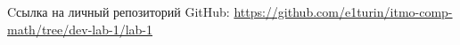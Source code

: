\begin{thebibliography}{}
 Cсылка на личный репозиторий GitHub: \url{https://github.com/e1turin/itmo-comp-math/tree/dev-lab-1/lab-1}\\
\end{thebibliography}